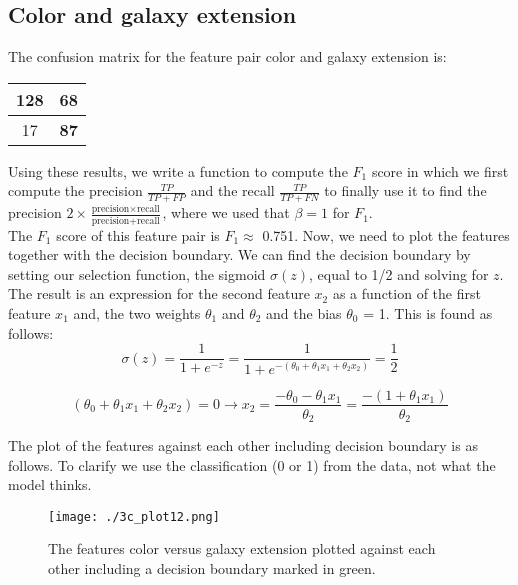 \newpage
\subsection*{Color and galaxy extension}

The confusion matrix for the feature pair color and galaxy extension is:

\begin{table}[!h]
\centering
\begin{tabular}{c|c}
\textbf{128} & 68\\ \hline
17 &   \textbf{87}\\
\end{tabular}
\end{table}

Using these results, we write a function to compute the $F_1$ score in which we first compute the precision $\frac{TP}{TP + FP}$ and the recall $\frac{TP}{TP + FN}$ to finally use it to find the precision $2 \times \frac{\text{precision} \times \text{recall}}{\text{precision} + \text{recall}}$, where we used that $\beta = 1$ for $F_1$.\\

The $F_1$ score of this feature pair is $F_1 \approx$ 0.751. Now, we need to plot the features together with the decision boundary. We can find the decision boundary by setting our selection function, the sigmoid $\sigma(z)$, equal to 1/2 and solving for $z$. The result is an expression for the second feature $x_2$ as a function of the first feature $x_1$ and, the two weights $\theta_1$ and $\theta_2$ and the bias $\theta_0$ = 1. This is found as follows:\\

\begin{equation}
\sigma(z) = \frac{1}{1 + e^{-z}} =  \frac{1}{1 + e^{-(\theta_0 + \theta_1 x_1 + \theta_2 x_2)}} = \frac{1}{2}
\end{equation}

\begin{equation}
(\theta_0 + \theta_1 x_1 + \theta_2 x_2) = 0 \rightarrow x_2 = \frac{-\theta_0 - \theta_1 x_1}{\theta_2} = \frac{-(1 + \theta_1 x_1)}{\theta_2}
\end{equation}

The plot of the features against each other including decision boundary is as follows. To clarify we use the classification (0 or 1) from the data, not what the model thinks.\\

\begin{figure}[h!]
  \centering
  \texttt{[image: ./3c\_plot12.png]}
  \caption{The features color versus galaxy extension plotted against each other including a decision boundary marked in green.}
\end{figure}

